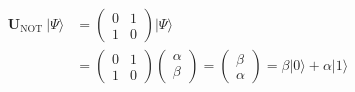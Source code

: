 \documentclass{book}
\begin{document}
\begin{center}
$$	\begin{aligned}
		\boldsymbol{U}_{\text {NOT }}|\Psi\rangle & =\left(\begin{array}{ll}
			0 & 1 \\
			1 & 0
		\end{array}\right)|\Psi\rangle \\
		& =\left(\begin{array}{ll}
			0 & 1 \\
			1 & 0
		\end{array}\right)\left(\begin{array}{l}
			\alpha \\
			\beta
		\end{array}\right)=\left(\begin{array}{l}
			\beta \\
			\alpha
		\end{array}\right)=\beta|0\rangle+\alpha|1\rangle
	\end{aligned}$$
\end{center}
\end{document}
